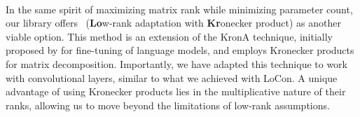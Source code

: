 


\paragraph{\lokr\afterhead}
In the same spirit of maximizing matrix rank while minimizing parameter count, our library offers \lokr~(\textbf{Lo}w-rank adaptation with \textbf{Kr}onecker product) as another viable option. This method is an extension of the KronA technique, initially proposed by \citet{edalati2022krona} for fine-tuning of language models, and employs Kronecker products for matrix decomposition. Importantly, we have adapted this technique to work with convolutional layers, similar to what we achieved with LoCon.
A unique advantage of using Kronecker products lies in the multiplicative nature of their ranks, allowing us to move beyond the limitations of low-rank assumptions.
 
